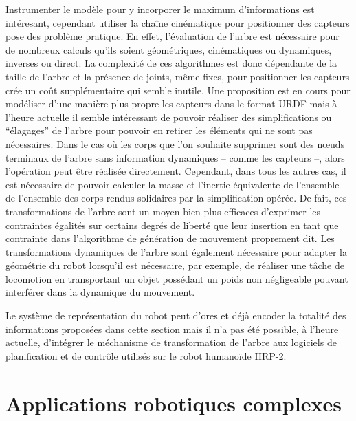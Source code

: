 Instrumenter le modèle pour y incorporer le maximum d'informations est
intéresant, cependant utiliser la chaîne cinématique pour positionner
des capteurs pose des problème pratique. En effet, l'évaluation de
l'arbre est nécessaire pour de nombreux calculs qu'ils soient
géométriques, cinématiques ou dynamiques, inverses ou direct. La
complexité de ces algorithmes est donc dépendante de la taille de
l'arbre et la présence de joints, même fixes, pour positionner les
capteurs crée un coût supplémentaire qui semble inutile. Une
proposition est en cours pour modéliser d'une manière plus propre les
capteurs dans le format URDF mais à l'heure actuelle il semble
intéressant de pouvoir réaliser des simplifications ou ``élagages'' de
l'arbre pour pouvoir en retirer les éléments qui ne sont pas
nécessaires. Dans le cas où les corps que l'on souhaite supprimer sont
des n\oe uds terminaux de l'arbre sans information dynamiques -- comme
les capteurs --, alors l'opération peut être réalisée
directement. Cependant, dans tous les autres cas, il est nécessaire de
pouvoir calculer la masse et l'inertie équivalente de l'ensemble de
l'ensemble des corps rendus solidaires par la simplification
opérée. De fait, ces transformations de l'arbre sont un moyen bien
plus efficaces d'exprimer les contraintes égalités sur certains degrés
de liberté que leur insertion en tant que contrainte dans l'algorithme
de génération de mouvement proprement dit. Les transformations
dynamiques de l'arbre sont également nécessaire pour adapter la
géométrie du robot lorsqu'il est nécessaire, par exemple, de réaliser
une tâche de locomotion en transportant un objet possédant un poids
non négligeable pouvant interférer dans la dynamique du mouvement.

Le système de représentation du robot peut d'ores et déjà encoder la
totalité des informations proposées dans cette section mais il n'a pas
été possible, à l'heure actuelle, d'intégrer le méchanisme de
transformation de l'arbre aux logiciels de planification et de
contrôle utilisés sur le robot humanoïde HRP-2.


\section{Applications robotiques complexes}


